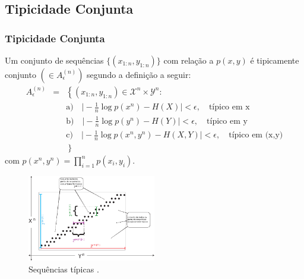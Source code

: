 \subsection{Tipicidade Conjunta}
\begin{frame}[allowframebreaks]
  \frametitle{Tipicidade Conjunta}
  \begin{definition}
  Um conjunto de sequências $\{(x_{1:n} , y_{1:n})\}$ com relação a $p(x,y)$ é tipicamente
  conjunto $(\in A_{\epsilon}^{(n)})$ segundo a definição a seguir:
  \begin{eqnarray}
  A_{\epsilon}^{(n)} &=& \left\{ (x_{1:n} , y_{1:n}) \in \mathcal{X}^n \times \mathcal{Y}^n : \right. \nonumber \\ 
		&& \text{a)} \quad \vert - \frac{1}{n} \log p(x^n) - H(X) \vert < \epsilon , \quad \text{típico em x} \nonumber \\
		&& \text{b)} \quad \vert - \frac{1}{n} \log p(y^n) - H(Y) \vert < \epsilon , \quad \text{típico em y} \nonumber \\
		&& \text{c)} \quad \vert - \frac{1}{n} \log p(x^n,y^n) - H(X,Y) \vert < \epsilon , \quad \text{típico em (x,y)} \nonumber \\
		&& \left. \right\} \label{eq-tipicidade-conjunta}
  \end{eqnarray}
  com $p(x^n,y^n) = \prod_{i=1}^n p(x_i,y_i)$.
  \end{definition}

  \framebreak

                \begin{figure}[h!]
                \centering
                \includegraphics[width=0.5\textwidth]{images/jtyseq.pdf}
		\caption{Sequências típicas \citep{bilmes2013}.}
                \label{fig:jtyseq}
                \end{figure}

  \framebreak


\end{frame}
